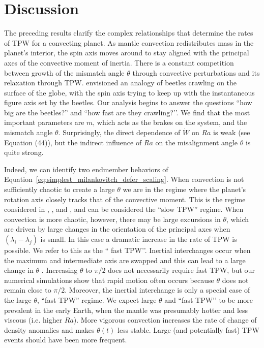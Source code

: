 \documentclass[preprint,12pt,authoryear]{elsarticle}
\begin{document}
\section{Discussion}
\label{sec:discussion}

The preceding results clarify the complex relationships that determine the rates of TPW for a convecting planet.
As mantle convection redistributes mass in the planet's interior, the spin axis moves around to stay aligned with the principal axes of the convective moment of inertia. 
There is a constant competition between growth of the mismatch angle $\theta$ through convective perturbations
 and its relaxation through TPW.
\citet{goldreich1969some} envisioned an analogy of beetles crawling on the surface of the globe, with
the spin axis trying to keep up with the instantaneous figure axis set by the beetles.
Our analysis begins to answer the questions ``how big are the beetles?'' and ``how fast are they crawling?’’. We find that the most important parameters are $m$, which acts as the brakes on the system, and the mismatch angle $\theta$. Surprisingly, the direct dependence of $\dot{W}$ on $Ra$ is weak (see Equation (44)), but the indirect influence of $Ra$ on the misalignment angle $\theta$ is quite strong.

Indeed, we can identify two endmember behaviors of Equation~\eqref{eq:simplest_milankovitch_defer_scaling}.
When convection is not sufficiently chaotic to create a large $\theta$ we are in the regime where the planet's rotation axis closely tracks that of the convective moment.
This is the regime considered in \citet{steinberger1997changes}, \citet{roberts2007cause}, and \citet{zhong2007supercontinent}, and can be considered the ``slow TPW'' regime.
When convection is more chaotic, however, there may be large excursions in $\theta$, 
which are driven by large changes in the orientation of the principal axes when $(\lambda_i - \lambda_j)$ is small.  
In this case a dramatic increase in the rate of TPW is possible. We refer to this as the `` fast TPW’’. Inertial interchanges occur when the maximum and intermediate axis are swapped and this can lead to a large change in 
 $\theta$ \citep{kirschvink1997evidence}.  Increasing $\theta$ to $\pi/2$ does not necessarily require fast TPW, but our numerical simulations show that rapid motion often occurs because $\theta$ does not remain close to $\pi/2$.  Moreover, the inertial interchange is only  a special case of the large $\theta$, ``fast TPW'' regime. We expect large $\theta$ and ``fast TPW’’ to be more prevalent in the early Earth, when the mantle was presumably hotter and less viscous (i.e. higher $Ra$). 
More vigorous convection increases the rate of change of density anomalies  and  makes
$\theta(t)$ less stable. Large (and potentially fast) TPW events should have been more frequent.
\end{document}
